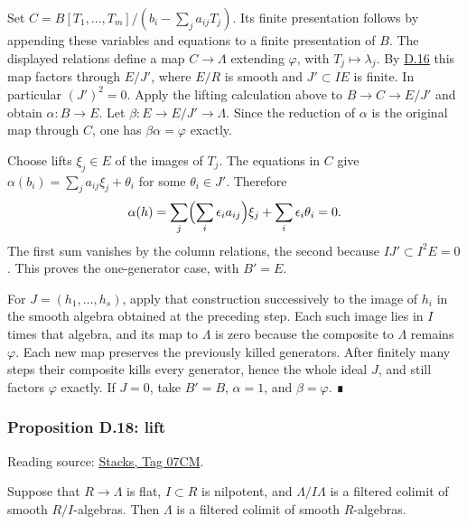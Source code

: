 \documentclass[11pt,a4paper,openany]{report}
\begin{document}
Set \(C=B[T_1,\ldots,T_m]/(b_i-\sum_j a_{ij}T_j)\). Its finite presentation follows by appending these variables and equations to a finite presentation of \(B\). The displayed relations define a map \(C\to\Lambda\) extending \(\varphi\), with \(T_j\mapsto\lambda_j\). By \hyperref[AG-RG-S05-smoothing-lemma-lift-once]{D.16} this map factors through \(E/J'\), where \(E/R\) is smooth and \(J'\subset IE\) is finite. In particular \((J')^2=0\). Apply the lifting calculation above to \(B\to C\to E/J'\) and obtain \(\alpha:B\to E\). Let \(\beta:E\to E/J'\to\Lambda\). Since the reduction of \(\alpha\) is the original map through \(C\), one has \(\beta\alpha=\varphi\) exactly.

Choose lifts \(\xi_j\in E\) of the images of \(T_j\). The equations in \(C\) give \(\alpha(b_i)=\sum_j a_{ij}\xi_j+\theta_i\) for some \(\theta_i\in J'\). Therefore \[\alpha(h)=\sum_j\Bigl(\sum_i\epsilon_i a_{ij}\Bigr)\xi_j
              +\sum_i\epsilon_i\theta_i=0.\] The first sum vanishes by the column relations, the second because \(IJ'\subset I^2E=0\). This proves the one-generator case, with \(B'=E\).

For \(J=(h_1,\ldots,h_s)\), apply that construction successively to the image of \(h_i\) in the smooth algebra obtained at the preceding step. Each such image lies in \(I\) times that algebra, and its map to \(\Lambda\) is zero because the composite to \(\Lambda\) remains \(\varphi\). Each new map preserves the previously killed generators. After finitely many steps their composite kills every generator, hence the whole ideal \(J\), and still factors \(\varphi\) exactly. If \(J=0\), take \(B'=B\), \(\alpha=1\), and \(\beta=\varphi\). ∎

\label{AG-RG-S05-smoothing-proposition-lift}

\subsubsection{Proposition D.18: lift}\label{AG-RG-S05-proposition-d.18-lift}

Reading source: \href{https://stacks.math.columbia.edu/tag/07CM}{Stacks, Tag 07CM}.

Suppose that \(R\to\Lambda\) is flat, \(I\subset R\) is nilpotent, and \(\Lambda/I\Lambda\) is a filtered colimit of smooth \(R/I\)-algebras. Then \(\Lambda\) is a filtered colimit of smooth \(R\)-algebras.
\end{document}
